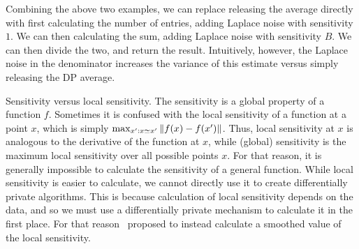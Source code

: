 \begin{frame}
  Combining the above two examples, we can replace releasing the average directly with first calculating the number of entries, adding Laplace noise with sensitivity $1$. We can then calculating the sum, adding Laplace noise with sensitivity $B$. We can then divide the two, and return the result. Intuitively, however, the Laplace noise in the denominator increases the variance of this estimate versus simply releasing the DP average.
  
  \begin{alertblock}{Sensitivity versus local sensitivity.}
    The sensitivity is a global property of a function $f$. Sometimes it is confused with the \alert{local} sensitivity of a function at a point $x$, which is simply $\max_{x': x \simeq x'} \|f(x) - f(x')\|$. Thus, local sensitivity at $x$ is analogous to the derivative of the function at $x$, while (global) sensitivity is the maximum local sensitivity over all possible points $x$. For that reason, it is generally impossible to calculate the sensitivity of a general function. While local sensitivity is easier to calculate, we cannot directly use it to create differentially private algorithms. This is because calculation of local sensitivity depends on the data, and so we must use a differentially private mechanism to calculate it in the first place. For that reason~\citet{nissim2007smooth} proposed to instead calculate a smoothed value of the local sensitivity.
  \end{alertblock}


\end{frame}

